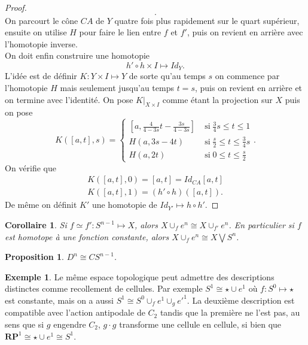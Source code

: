 \documentclass[12pt]{book}
\newtheorem{cor}[lemma]{Corollaire}
\newtheorem{prop}[lemma]{Proposition}
\theoremstyle{definition}
\newtheorem{example}[lemma]{Exemple}
\theoremstyle{remark}
\begin{document}
\begin{proof}
\[		.\] 
		On parcourt le cône $CA$ de $Y$ quatre fois plus rapidement sur le quart supérieur, ensuite on utilise $H$ pour faire le lien entre $f$ et $f'$, puis on revient en arrière avec l'homotopie inverse. \\
		On doit enfin construire une homotopie \[
			h'\circ h \times I \longmapsto Id_{Y}
		.\] 
		L'idée est de définir $K : Y \times I \longmapsto Y$ de sorte qu'au temps $s$ on commence par l'homotopie $H$ mais seulement jusqu'au temps $t=s$, puis on revient en arrière et on termine avec l'identité.
		On pose $K|_{X\times I}$ comme étant la projection sur $X$ puis on pose  \[
			K([a,t],s) = \begin{cases}
				[a, \frac{4}{4-3s}t-\frac{3s}{4-3s}] \; &\text{si} \; \frac{3}{4}s \le t \le 1 \\
				H(a,3s-4t) \; &\text{si} \; \frac{s}{2} \le t \le \frac{3}{4}s \\
				H(a,2t) \; &\text{si} \; 0 \le t \le \frac{s}{2}
			\end{cases}
		.\] 
		On vérifie que 
		\begin{align*}
			K([a,t],0) = [a,t] = Id_{CA}[a,t] \\
			K([a,t],1) = (h'\circ h)([a,t])
		.\end{align*}
		De même on définit $K'$ une homotopie de  $Id_{Y'} \longmapsto h \circ h'$.
	\end{proof}
	\begin{cor}
		Si $f \simeq f' : S^{n-1} \longmapsto X$, alors $X \cup_f e^n \cong X \cup_{f'}e^n$. En particulier si $f$ est homotope à une fonction constante, alors $X \cup_f e^n \cong X \bigvee S^n$.
	\end{cor}
	\begin{prop}
		$D^n \cong CS^{n-1}$.
	\end{prop}
	\begin{example}
		Le même espace topologique peut admettre des descriptions distinctes comme recollement de cellules. Par exemple $S^1 \cong \star \cup e^1$ où  $f : S^0 \longmapsto \star$ est constante, mais on a aussi $S^1 \cong S^0 \cup_f e^1 \cup_g e'^1$. La deuxième description est compatible avec l'action antipodale de $C_2$ tandis que la première ne l'est pas, au sens que si $g$ engendre  $C_2$,  $g \cdot g$ transforme une cellule en cellule, si bien que $\mathbf{RP}^1 \cong \star \cup e^1 \cong S^1$.
	\end{example}
\end{document}
